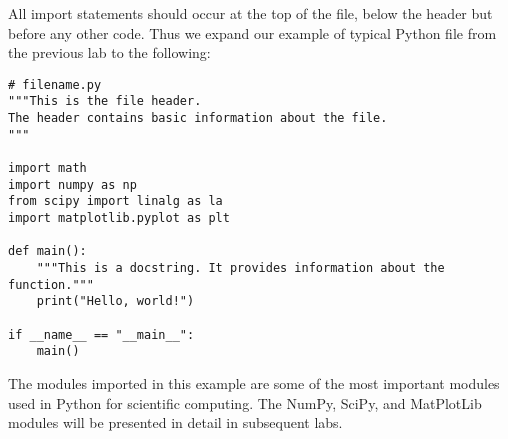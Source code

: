 All import statements should occur at the top of the file, below the header but before any other code.
Thus we expand our example of typical Python file from the previous lab to the following:

\begin{lstlisting}
# filename.py
"""This is the file header.
The header contains basic information about the file.
"""

import math
import numpy as np
from scipy import linalg as la
import matplotlib.pyplot as plt

def main():
    """This is a docstring. It provides information about the function."""
    print("Hello, world!")

if __name__ == "__main__":
    main()
\end{lstlisting}

The modules imported in this example are some of the most important modules used in Python for scientific computing.
The NumPy, SciPy, and MatPlotLib modules will be presented in detail in subsequent labs.

